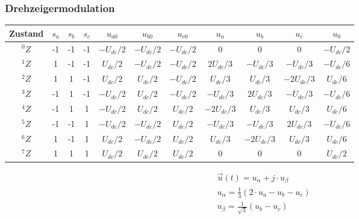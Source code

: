 \subsubsection{Drehzeigermodulation}
{\centering\tiny\setlength{\tabcolsep}{1.5pt}\renewcommand{\arraystretch}{1.05}
\begin{tabular}{|c|c|c|c|c|c|c|c|c|c|c|}
\hline
Zustand & $s_a$ & $s_b$ & $s_c$ & $u_{a0}$ & $u_{b0}$ & $u_{c0}$ & $u_a$ & $u_b$ & $u_c$ & $u_0$ \\ \hline
$^0Z$ & -1 & -1 & -1 & $-U_{dc}/2$ & $-U_{dc}/2$ & $-U_{dc}/2$ & 0 & 0 & 0 & $-U_{dc}/2$ \\ \hline
$^1Z$ & 1 & -1 & -1 & $U_{dc}/2$ & $-U_{dc}/2$ & $-U_{dc}/2$ & $2U_{dc}/3$ & $-U_{dc}/3$ & $-U_{dc}/3$ & $-U_{dc}/6$ \\ \hline
$^2Z$ & 1 & 1 & -1 & $U_{dc}/2$ & $U_{dc}/2$ & $-U_{dc}/2$ & $U_{dc}/3$ & $U_{dc}/3$ & $-2U_{dc}/3$ & $U_{dc}/6$ \\ \hline
$^3Z$ & -1 & 1 & -1 & $-U_{dc}/2$ & $U_{dc}/2$ & $-U_{dc}/2$ & $-U_{dc}/3$ & $2U_{dc}/3$ & $-U_{dc}/3$ & $-U_{dc}/6$ \\ \hline
$^4Z$ & -1 & 1 & 1 & $-U_{dc}/2$ & $U_{dc}/2$ & $U_{dc}/2$ & $-2U_{dc}/3$ & $U_{dc}/3$ & $U_{dc}/3$ & $U_{dc}/6$ \\ \hline
$^5Z$ & -1 & -1 & 1 & $-U_{dc}/2$ & $-U_{dc}/2$ & $U_{dc}/2$ & $-U_{dc}/3$ & $-U_{dc}/3$ & $2U_{dc}/3$ & $-U_{dc}/6$ \\ \hline
$^6Z$ & 1 & -1 & 1 & $U_{dc}/2$ & $-U_{dc}/2$ & $U_{dc}/2$ & $U_{dc}/3$ & $-2U_{dc}/3$ & $U_{dc}/3$ & $U_{dc}/6$ \\ \hline
$^7Z$ & 1 & 1 & 1 & $U_{dc}/2$ & $U_{dc}/2$ & $U_{dc}/2$ & 0 & 0 & 0 & $U_{dc}/2$ \\ \hline
\end{tabular}\par}
\begin{gather*}
\vec{u}(t) = u_\alpha + j \cdot u_\beta \\
u_\alpha = \frac{1}{3}(2 \cdot u_a - u_b - u_c) \\
u_\beta = \frac{1}{\sqrt{3}}(u_b - u_c)
\end{gather*}

